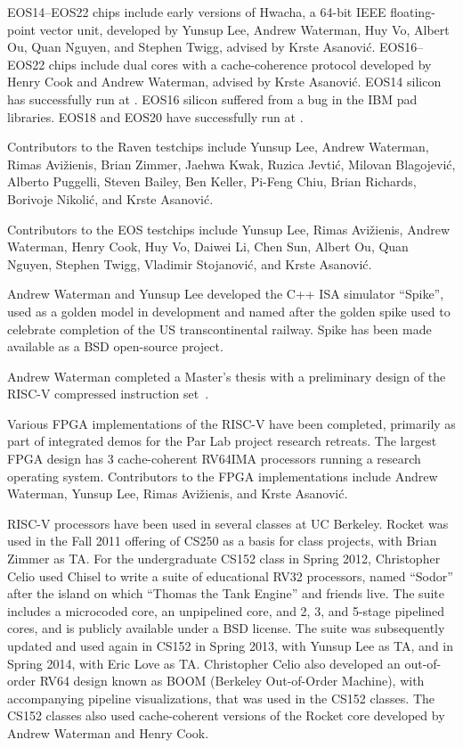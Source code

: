 EOS14--EOS22 chips include early versions of Hwacha, a 64-bit IEEE
floating-point vector unit, developed by Yunsup Lee, Andrew Waterman,
Huy Vo, Albert Ou, Quan Nguyen, and Stephen Twigg, advised by Krste
Asanovi\'{c}.  EOS16--EOS22 chips include dual cores with a
cache-coherence protocol developed by Henry Cook and Andrew Waterman,
advised by Krste Asanovi\'{c}.  EOS14 silicon has successfully run at
. EOS16 silicon suffered from a bug in the IBM pad
libraries.  EOS18 and EOS20 have successfully run at .

Contributors to the Raven testchips include Yunsup Lee, Andrew Waterman,
Rimas Avi\v{z}ienis, Brian Zimmer, Jaehwa Kwak, Ruzica Jevti\'{c},
Milovan Blagojevi\'{c}, Alberto Puggelli, Steven Bailey, Ben Keller,
Pi-Feng Chiu, Brian Richards, Borivoje Nikoli\'{c}, and Krste
Asanovi\'{c}.

Contributors to the EOS testchips include Yunsup Lee, Rimas
Avi\v{z}ienis, Andrew Waterman, Henry Cook, Huy Vo, Daiwei Li, Chen Sun,
Albert Ou, Quan Nguyen, Stephen Twigg, Vladimir Stojanovi\'{c}, and
Krste Asanovi\'{c}.

Andrew Waterman and Yunsup Lee developed the C++ ISA simulator
``Spike'', used as a golden model in development and named after the
golden spike used to celebrate completion of the US transcontinental
railway.  Spike has been made available as a BSD open-source project.

Andrew Waterman completed a Master's thesis with a preliminary design
of the RISC-V compressed instruction set~\cite{waterman-ms}. 

Various FPGA implementations of the RISC-V have been completed,
primarily as part of integrated demos for the Par Lab project research
retreats.  The largest FPGA design has 3 cache-coherent RV64IMA
processors running a research operating system.  Contributors to the
FPGA implementations include Andrew Waterman, Yunsup Lee, Rimas
Avi\v{z}ienis, and Krste Asanovi\'{c}.

RISC-V processors have been used in several classes at UC Berkeley.
Rocket was used in the Fall 2011 offering of CS250 as a basis for class
projects, with Brian Zimmer as TA.  For the undergraduate CS152 class in
Spring 2012, Christopher Celio used Chisel to write a suite of educational
RV32 processors, named ``Sodor'' after the island on which ``Thomas the
Tank Engine'' and friends live.  The suite includes a microcoded core,
an unpipelined core, and 2, 3, and 5-stage pipelined cores, and is
publicly available under a BSD license.  The suite was subsequently
updated and used again in CS152 in Spring 2013, with Yunsup Lee as TA,
and in Spring 2014, with Eric Love as TA.
Christopher Celio also developed an out-of-order RV64 design known as BOOM
(Berkeley Out-of-Order Machine), with accompanying pipeline
visualizations, that was used in the CS152 classes.  The CS152 classes
also used cache-coherent versions of the Rocket core developed by Andrew
Waterman and Henry Cook.

